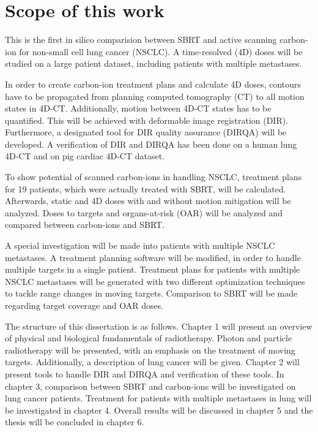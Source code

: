 \newpage

\section*{Scope of this work}

This is the first in silico comparision between SBRT and active scanning carbon-ion for non-small cell lung cancer (NSCLC). A time-resolved (4D) doses will be studied on a large patient dataset, including patients with multiple metastases.

In order to create carbon-ion treatment plans and calculate 4D doses, contours have to be propagated from planning computed tomography (CT) to all motion states in 4D-CT. Additionally, motion between 4D-CT states has to be quantified. 
This will be achieved with deformable image registration (DIR). 
Furthermore, a designated tool for DIR quality assurance (DIRQA) will be developed. A verification of DIR and DIRQA has been done on a human lung 4D-CT and on pig cardiac 4D-CT dataset.

To show potential of scanned carbon-ions in handling NSCLC, treatment plans for 19 patients, which were actually treated with SBRT, will be calculated. Afterwards, static and 4D doses with and without motion
mitigation will be analyzed. Doses to targets and organs-at-risk (OAR) will be analyzed and compared between carbon-ions and SBRT.

A special investigation will be made into patients with multiple NSCLC metastases. A treatment planning software will be modified, in order to handle multiple targets in a single patient. 
Treatment plans for patients with multiple NSCLC metastases will be generated with two different optimization techniques to tackle range changes in moving targets. Comparison to SBRT will be made regarding target coverage and OAR doses.

The structure of this dissertation is as follows. Chapter 1 will present an overview of physical and biological fundamentals of radiotherapy. Photon and particle radiotherapy will be presented, with an emphasis on the treatment of moving targets.
Additionally, a description of lung cancer will be given. Chapter 2 will present tools to handle DIR and DIRQA and verification of these tools. In chapter 3, comparison between SBRT and carbon-ions will be investigated on lung cancer patients.
Treatment for patients with multiple metastases in lung will be investigated in chapter 4. Overall results will be discussed in chapter 5 and the thesis will be concluded in chapter 6.
